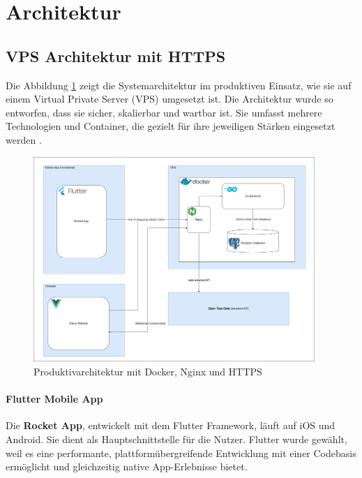 \documentclass[11pt,a4paper]{article}
\begin{document}
\section{Architektur}

\subsection{VPS Architektur mit HTTPS}

Die Abbildung \ref{fig:https-architektur} zeigt die Systemarchitektur im produktiven Einsatz, wie sie auf einem Virtual Private Server (VPS) umgesetzt ist. Die Architektur wurde so entworfen, dass sie sicher, skalierbar und wartbar ist. Sie umfasst mehrere Technologien und Container, die gezielt für ihre jeweiligen Stärken eingesetzt werden \cite{docker}\cite{golang}\cite{nginx}\cite{postgresql}.

\begin{figure}[H]
    \centering
    \includegraphics[width=0.95\textwidth]{images/HttpsArchitektur.png}
    \caption{Produktivarchitektur mit Docker, Nginx und HTTPS}
    \label{fig:https-architektur}
\end{figure}

\paragraph{Flutter Mobile App}
Die \textbf{Rocket App}, entwickelt mit dem Flutter Framework\cite{flutter}, läuft auf iOS und Android. Sie dient als Hauptschnittstelle für die Nutzer. Flutter wurde gewählt, weil es eine performante, plattformübergreifende Entwicklung mit einer Codebasis ermöglicht und gleichzeitig native App-Erlebnisse bietet.
\end{document}
